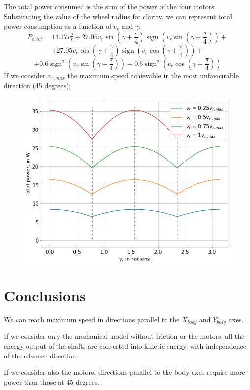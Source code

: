 \documentclass[12pt]{article}
\begin{document}
The total power consumed is the sum of the power of the four motors. Substituting the value of the wheel radius for clarity, we can represent total power consumption as a function of $v_r$ and $\gamma$:
$$P_{e,tot} =14.17 v_{r}^{2} + 27.05 v_{r} \operatorname{sin}\left(\gamma + \frac{\pi}{4}\right) \operatorname{sign}\left(v_{r} \operatorname{sin}\left(\gamma + \frac{\pi}{4}\right)\right) +$$
$$+ 27.05 v_{r} \operatorname{cos}\left(\gamma + \frac{\pi}{4}\right) \operatorname{sign}\left(v_{r} \operatorname{cos}\left(\gamma + \frac{\pi}{4}\right)\right) +$$ 
$$+ 0.6 \operatorname{sign}^{2}\left(v_{r} \operatorname{sin}\left(\gamma + \frac{\pi}{4}\right)\right) + 0.6 \operatorname{sign}^{2}\left(v_{r} \operatorname{cos}\left(\gamma + \frac{\pi}{4}\right)\right)$$
If we consider $v_{r,max}$ the maximum speed achievable in the most unfavourable direction (45 degrees):
\begin{figure}[h]
	\centering
	\includegraphics[width=.5\linewidth]{total_power}
	\label{fig:total_power}
\end{figure}

\section*{Conclusions}

We can reach maximum speed in directions parallel to the $X_{body}$ and $Y_{body}$ axes.

If we consider only the mechanical model without friction or the motors, all the energy output of the shafts are converted into kinetic energy, with independence of the advence direction.

If we consider also the motors, directions parallel to the body axes require more power than those at 45 degrees.
\end{document}
